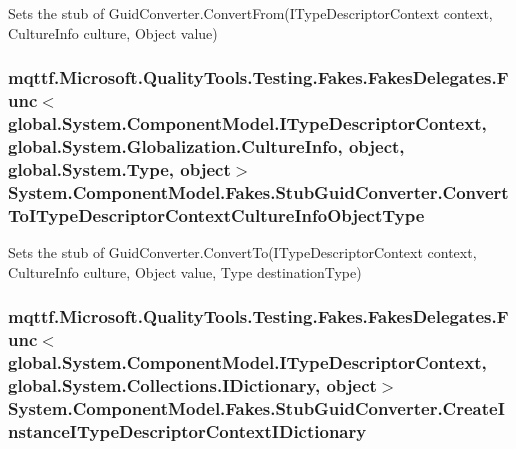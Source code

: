 Sets the stub of Guid\-Converter.\-Convert\-From(\-I\-Type\-Descriptor\-Context context, Culture\-Info culture, Object value)

\hypertarget{class_system_1_1_component_model_1_1_fakes_1_1_stub_guid_converter_ab3ed4d1ad871aa6f02962f2a4ebb2f76}{
\subsubsection[{Convert\-To\-I\-Type\-Descriptor\-Context\-Culture\-Info\-Object\-Type}]{\setlength{\rightskip}{0pt plus 5cm}mqttf.\-Microsoft.\-Quality\-Tools.\-Testing.\-Fakes.\-Fakes\-Delegates.\-Func$<$global.\-System.\-Component\-Model.\-I\-Type\-Descriptor\-Context, global.\-System.\-Globalization.\-Culture\-Info, object, global.\-System.\-Type, object$>$ System.\-Component\-Model.\-Fakes.\-Stub\-Guid\-Converter.\-Convert\-To\-I\-Type\-Descriptor\-Context\-Culture\-Info\-Object\-Type}}\label{class_system_1_1_component_model_1_1_fakes_1_1_stub_guid_converter_ab3ed4d1ad871aa6f02962f2a4ebb2f76}


Sets the stub of Guid\-Converter.\-Convert\-To(\-I\-Type\-Descriptor\-Context context, Culture\-Info culture, Object value, Type destination\-Type)

\hypertarget{class_system_1_1_component_model_1_1_fakes_1_1_stub_guid_converter_a7a1ea3c3f6b44ed71da4a69243e5a05a}{
\subsubsection[{Create\-Instance\-I\-Type\-Descriptor\-Context\-I\-Dictionary}]{\setlength{\rightskip}{0pt plus 5cm}mqttf.\-Microsoft.\-Quality\-Tools.\-Testing.\-Fakes.\-Fakes\-Delegates.\-Func$<$global.\-System.\-Component\-Model.\-I\-Type\-Descriptor\-Context, global.\-System.\-Collections.\-I\-Dictionary, object$>$ System.\-Component\-Model.\-Fakes.\-Stub\-Guid\-Converter.\-Create\-Instance\-I\-Type\-Descriptor\-Context\-I\-Dictionary}}\label{class_system_1_1_component_model_1_1_fakes_1_1_stub_guid_converter_a7a1ea3c3f6b44ed71da4a69243e5a05a}


